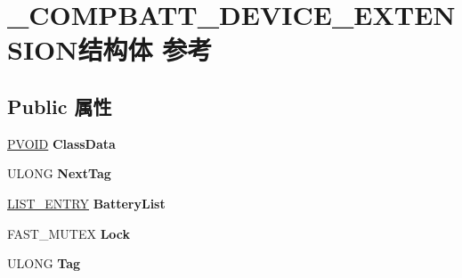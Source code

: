 \hypertarget{struct___c_o_m_p_b_a_t_t___d_e_v_i_c_e___e_x_t_e_n_s_i_o_n}{}\section{\+\_\+\+C\+O\+M\+P\+B\+A\+T\+T\+\_\+\+D\+E\+V\+I\+C\+E\+\_\+\+E\+X\+T\+E\+N\+S\+I\+O\+N结构体 参考}
\label{struct___c_o_m_p_b_a_t_t___d_e_v_i_c_e___e_x_t_e_n_s_i_o_n}
\subsection*{Public 属性}
\begin{DoxyCompactItemize}
\item 
\mbox{\label{struct___c_o_m_p_b_a_t_t___d_e_v_i_c_e___e_x_t_e_n_s_i_o_n_ac36c5c1dc53d6c0090afb3cf7adc635e}} 
\hyperlink{interfacevoid}{P\+V\+O\+ID} {\bfseries Class\+Data}
\item 
\mbox{\label{struct___c_o_m_p_b_a_t_t___d_e_v_i_c_e___e_x_t_e_n_s_i_o_n_a072a1a4745527c8c132f73473cbb6f71}} 
U\+L\+O\+NG {\bfseries Next\+Tag}
\item 
\mbox{\label{struct___c_o_m_p_b_a_t_t___d_e_v_i_c_e___e_x_t_e_n_s_i_o_n_afeea59c49295f033425e44b110c7cb68}} 
\hyperlink{struct___l_i_s_t___e_n_t_r_y}{L\+I\+S\+T\+\_\+\+E\+N\+T\+RY} {\bfseries Battery\+List}
\item 
\mbox{\label{struct___c_o_m_p_b_a_t_t___d_e_v_i_c_e___e_x_t_e_n_s_i_o_n_abd1938dd17a2df89b37b6f98aed1b277}} 
F\+A\+S\+T\+\_\+\+M\+U\+T\+EX {\bfseries Lock}
\item 
\mbox{\label{struct___c_o_m_p_b_a_t_t___d_e_v_i_c_e___e_x_t_e_n_s_i_o_n_a7dc3e28b87c220c5c3825da435e3c80e}} 
U\+L\+O\+NG {\bfseries Tag}
\item 
\mbox{\label{struct___c_o_m_p_b_a_t_t___d_e_v_i_c_e___e_x_t_e_n_s_i_o_n_a925184226c16ac7009cc761bca1881d9}} 

\end{DoxyCompactItemize}
